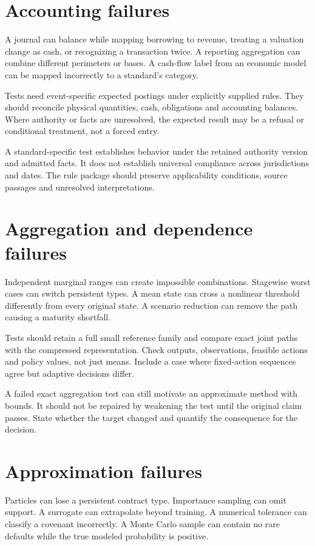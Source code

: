 \section{Accounting failures}
A journal can balance while mapping borrowing to revenue, treating a valuation change as cash, or recognizing a transaction twice. A reporting aggregation can combine different perimeters or bases. A cash-flow label from an economic model can be mapped incorrectly to a standard's category.

Tests need event-specific expected postings under explicitly supplied rules. They should reconcile physical quantities, cash, obligations and accounting balances. Where authority or facts are unresolved, the expected result may be a refusal or conditional treatment, not a forced entry.

A standard-specific test establishes behavior under the retained authority version and admitted facts. It does not establish universal compliance across jurisdictions and dates. The rule package should preserve applicability conditions, source passages and unresolved interpretations.

\section{Aggregation and dependence failures}
Independent marginal ranges can create impossible combinations. Stagewise worst cases can switch persistent types. A mean state can cross a nonlinear threshold differently from every original state. A scenario reduction can remove the path causing a maturity shortfall.

Tests should retain a full small reference family and compare exact joint paths with the compressed representation. Check outputs, observations, feasible actions and policy values, not just means. Include a case where fixed-action sequences agree but adaptive decisions differ.

A failed exact aggregation test can still motivate an approximate method with bounds. It should not be repaired by weakening the test until the original claim passes. State whether the target changed and quantify the consequence for the decision.

\section{Approximation failures}
Particles can lose a persistent contract type. Importance sampling can omit support. A surrogate can extrapolate beyond training. A numerical tolerance can classify a covenant incorrectly. A Monte Carlo sample can contain no rare defaults while the true modeled probability is positive.

